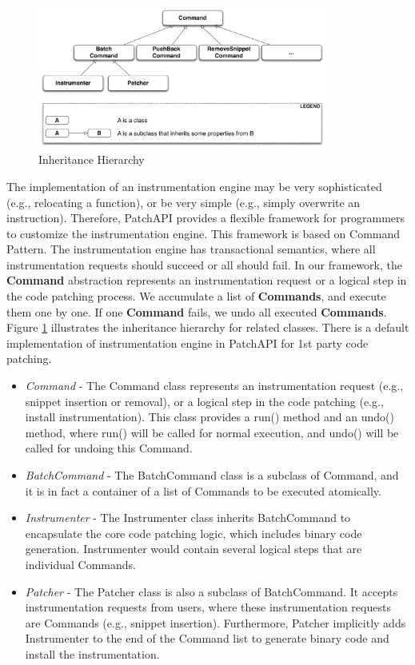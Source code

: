 \begin{figure}[htb]
\centerline{\includegraphics[width=0.85\textwidth]{./figure/command/img.pdf}}
\caption{\label{fig:inh}Inheritance Hierarchy}
\end{figure}


The implementation of an instrumentation engine may be very sophisticated (e.g.,
relocating a function), or be very simple (e.g., simply overwrite an
instruction). Therefore, PatchAPI provides a flexible framework for programmers
to customize the instrumentation engine. This framework is based on Command
Pattern. The instrumentation engine has transactional semantics, where all
instrumentation requests should succeed or all should fail. In our framework,
the \textbf{Command} abstraction represents an instrumentation request or a logical
step in the code patching process. We accumulate a list of \textbf{Commands}, and
execute them one by one. If one \textbf{Command} fails, we undo all executed
\textbf{Commands}. Figure \ref{fig:inh} illustrates the inheritance hierarchy for
related classes. There is a default implementation of instrumentation engine in
PatchAPI for 1st party code patching.
\begin{itemize}
\item \emph{Command} - The Command class represents an instrumentation request (e.g.,
    snippet insertion or removal), or a logical step in the code patching (e.g.,
    install instrumentation). This class provides a run() method and an undo()
    method, where run() will be called for normal execution, and undo() will be
    called for undoing this Command.
\item \emph{BatchCommand} - The BatchCommand class is a subclass of Command, and it is
    in fact a container of a list of Commands to be executed atomically.
\item \emph{Instrumenter} - The Instrumenter class inherits BatchCommand to encapsulate
    the core code patching logic, which includes binary code generation.
    Instrumenter would contain several logical steps that are individual
    Commands.
\item \emph{Patcher} - The Patcher class is also a subclass of BatchCommand. It accepts
    instrumentation requests from users, where these instrumentation requests
    are Commands (e.g., snippet insertion). Furthermore, Patcher implicitly adds
    Instrumenter to the end of the Command list to generate binary code and
    install the instrumentation.
\end{itemize}
